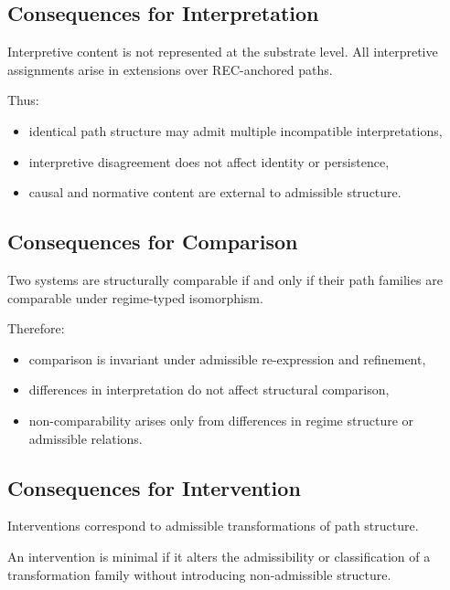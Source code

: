 \subsection{Consequences for Interpretation}
\label{subsec:interpretation_consequences}

Interpretive content is not represented at the substrate level.
All interpretive assignments arise in extensions over REC-anchored paths.

Thus:

\begin{itemize}
  \item identical path structure may admit multiple incompatible interpretations,
  \item interpretive disagreement does not affect identity or persistence,
  \item causal and normative content are external to admissible structure.
\end{itemize}

\subsection{Consequences for Comparison}
\label{subsec:comparison_consequences}

Two systems are structurally comparable if and only if
their path families are comparable under regime-typed isomorphism.

Therefore:

\begin{itemize}
  \item comparison is invariant under admissible re-expression and refinement,
  \item differences in interpretation do not affect structural comparison,
  \item non-comparability arises only from differences in regime structure
        or admissible relations.
\end{itemize}

\subsection{Consequences for Intervention}
\label{subsec:intervention_consequences}

Interventions correspond to admissible transformations
of path structure.

An intervention is minimal if it alters the admissibility
or classification of a transformation family
without introducing non-admissible structure.

